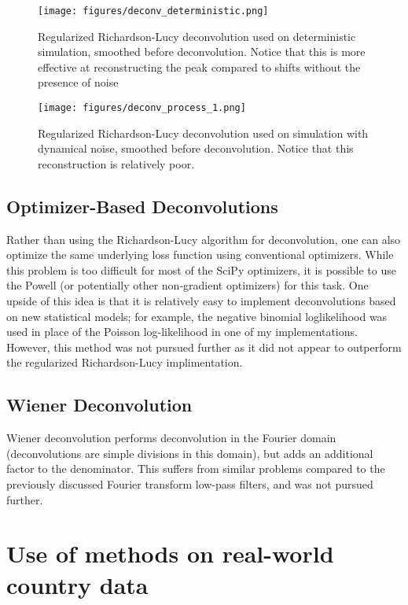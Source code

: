 \documentclass{article}
\begin{document}
\clearpage
\begin{figure}[h!]
    \centering
    \texttt{[image: figures/deconv\_deterministic.png]}
    \caption{Regularized Richardson-Lucy deconvolution used on deterministic simulation, smoothed before deconvolution. Notice that this is more effective at reconstructing the peak compared to shifts without the presence of noise}
    \label{fig:my_label}
\end{figure}

\clearpage
\begin{figure}[h!]
    \centering
    \texttt{[image: figures/deconv\_process\_1.png]}
    \caption{Regularized Richardson-Lucy deconvolution used on simulation with dynamical noise, smoothed before deconvolution. Notice that this reconstruction is relatively poor.}
    \label{fig:my_label}
\end{figure}

\subsection{Optimizer-Based Deconvolutions}
Rather than using the Richardson-Lucy algorithm for deconvolution, one can also optimize the same underlying loss function using conventional optimizers. While this problem is too difficult for most of the SciPy optimizers, it is possible to use the Powell (or potentially other non-gradient optimizers) for this task. One upside of this idea is that it is relatively easy to implement deconvolutions based on new statistical models; for example, the negative binomial loglikelihood was used in place of the Poisson log-likelihood in one of my implementations. However, this method was not pursued further as it did not appear to outperform the regularized Richardson-Lucy implimentation.

\subsection{Wiener Deconvolution}
Wiener deconvolution performs deconvolution in the Fourier domain (deconvolutions are simple divisions in this domain), but adds an additional factor to the denominator. This suffers from similar problems compared to the previously discussed Fourier transform low-pass filters, and was not pursued further.

\section{Use of methods on real-world country data}
\end{document}
